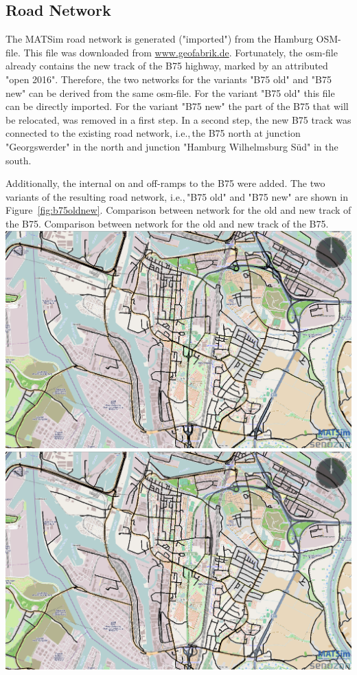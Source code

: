 \subsection{Road Network}
The MATSim road network is generated ("imported") from the Hamburg OSM-file. This file was downloaded from \url{www.geofabrik.de}. Fortunately, the osm-file already contains the new track of the B75 highway, marked by an attributed "open 2016". Therefore, the two networks for the variants "B75 old" and "B75 new" can be derived from the same osm-file. For the variant "B75 old" this file can be directly imported. For the variant "B75 new" the part of the B75 that will be relocated, was removed in a first step. In a second step, the new B75 track was connected to the existing road network, i.e.,\,the B75 north at junction "Georgswerder" in the north and junction "Hamburg Wilhelmsburg Süd" in the south.

Additionally, the internal on and off-ramps to the B75 were added. The two variants of the resulting road network, i.e.,\,"B75 old" and "B75 new" are shown in Figure~\ref{fig:b75oldnew}.
%
\createfigure%
{Comparison between network for the old and new track of the B75.}%
{Comparison between network for the old and new track of the B75.}%
{\label{fig:b75oldnew}}%
{%
  \createsubfigure%
  {}%
  {\includegraphics[width=.475\linewidth]{using/figures/B75old}}%
  {}%
  {}%
  \createsubfigure%
  {}%
  {\includegraphics[width=.475\linewidth]{using/figures/B75new}}
  {}%
  {}%
}%
  {}%

